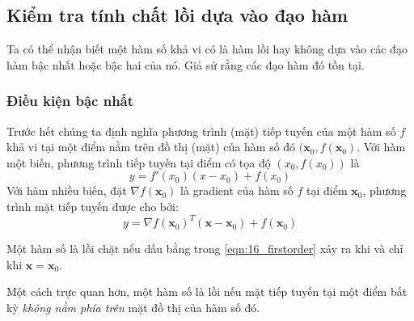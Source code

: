 

\subsection{Kiểm tra tính chất lồi dựa vào đạo hàm}
Ta có thể nhận biết một hàm số khả vi có là hàm lồi hay không dựa vào các
đạo hàm bậc nhất hoặc bậc hai của nó. Giả sử rằng các
đạo hàm đó tồn tại.

\subsubsection{Điều kiện bậc nhất}

Trước hết chúng ta định nghĩa phương trình (mặt) tiếp tuyến của một hàm số
$f$ khả vi tại một điểm nằm trên đồ thị (mặt) của hàm số đó $(\mathbf{x}_0,
f(\mathbf{x}_0)$. Với hàm một biến, phương trình tiếp tuyến tại điểm có tọa độ
$(x_0, f(x_0))$ là
\begin{equation*}
y = f'(x_0)(x - x_0) + f(x_0)
\end{equation*}
Với hàm nhiều biến, đặt $\nabla f(\mathbf{x}_0)$ là gradient của hàm số $f$ tại điểm $\mathbf{x}_0$, phương trình mặt tiếp tuyến được cho bởi:
\begin{equation*}
y = \nabla f(\mathbf{x}_0)^T (\mathbf{x} - \mathbf{x}_0) + f(\mathbf{x}_0)
\end{equation*}




Một hàm số là lồi chặt nếu dấu bằng trong \eqref{eqn:16_firstorder} xảy ra khi và chỉ khi $\mathbf{x} = \mathbf{x}_0$.

Một cách trực quan hơn, một hàm số là lồi nếu mặt tiếp tuyến tại một điểm
bất kỳ \textit{không nằm phía trên} mặt đồ thị của hàm số đó.



